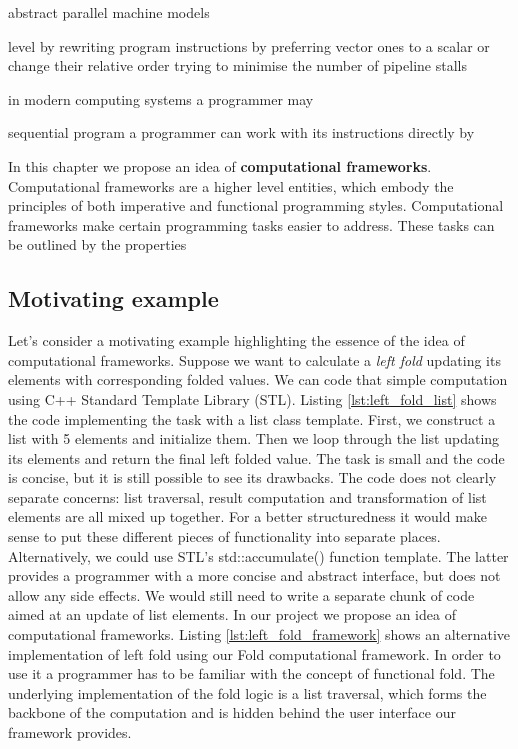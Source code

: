 abstract parallel machine models   

level by rewriting program instructions by preferring vector ones to a scalar or change their relative order trying to minimise the number of pipeline stalls    

in modern computing systems a programmer may 

sequential program a programmer can work with its instructions directly by 

\quad In this chapter we propose an idea of \textbf{computational frameworks}. Computational frameworks are a higher level entities, which embody the principles of both imperative and functional programming styles. Computational frameworks make certain programming tasks easier to address. These tasks can be outlined by the properties 

\subsection{Motivating example}
\label{frameworks_motivating_example}
\quad Let's consider a motivating example highlighting the essence of the idea of computational frameworks. Suppose we want to calculate a \textit{left fold} updating its elements with corresponding folded values.\newline\null
\quad We can code that simple computation using C++ Standard Template Library (STL). Listing \ref{lst:left_fold_list} shows the code implementing the task with a list class template. First, we construct a list with 5 elements and initialize them. Then we loop through the list updating its elements and return the final left folded value. The task is small and the code is concise, but it is still possible to see its drawbacks. The code does not clearly separate concerns: list traversal, result computation and transformation of list elements are all mixed up together. For a better structuredness it would make sense to put these different pieces of functionality into separate places. Alternatively, we could use STL's std::accumulate() function template. The latter provides a programmer with a more concise and abstract interface, but does not allow any side effects. We would still need to write a separate chunk of code aimed at an update of list elements.\newline\null 
\quad In our project we propose an idea of computational frameworks. Listing \ref{lst:left_fold_framework} shows an alternative implementation of left fold using our Fold computational framework. In order to use it a programmer has to be familiar with the concept of functional fold. The underlying implementation of the fold logic is a list traversal, which forms the backbone of the computation and is hidden behind the user interface our framework provides. 

